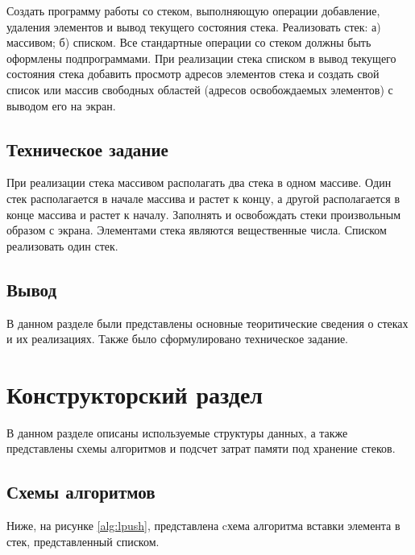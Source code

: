 Создать  программу  работы  со  стеком, 
выполняющую  операции  добавление, 
удаления  элементов  и  вывод  текущего 
состояния стека. Реализовать стек: 
а)  массивом;  б)  списком.  Все  стандартные 
операции со стеком должны быть оформлены 
подпрограммами.  При  реализации  стека 
списком  в  вывод  текущего  состояния  стека 
добавить просмотр адресов элементов стека и 
создать  свой  список  или  массив  свободных 
областей (адресов освобождаемых элементов) 
с выводом его на экран.

\section{Техническое задание}

При реализации стека массивом располагать два 
стека в одном массиве. Один стек располагается в 
начале массива и растет к концу, а другой 
располагается в конце массива и растет к началу. 
Заполнять и освобождать стеки произвольным 
образом с экрана. Элементами стека являются  
вещественные числа. Списком реализовать один 
стек.

\section{Вывод}

В данном разделе были представлены основные теоритические сведения о стеках и их реализациях. Также было сформулировано техническое задание.

\chapter{Конструкторский раздел}

В данном разделе описаны используемые структуры данных, а также представлены схемы алгоритмов и подсчет затрат памяти под хранение стеков.

\section{Схемы алгоритмов}

Ниже, на рисунке \ref{alg:lpush}, представлена cхема алгоритма вставки элемента в стек, представленный списком.

